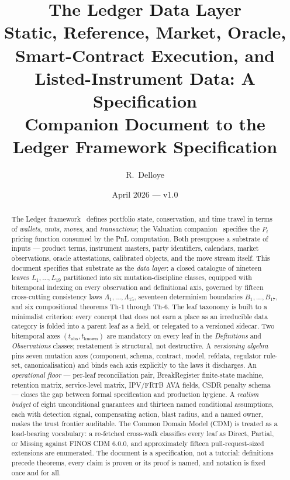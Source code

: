 \documentclass[11pt,a4paper]{article}
\title{The Ledger Data Layer\\[6pt]
\large Static, Reference, Market, Oracle, Smart-Contract Execution, and Listed-Instrument Data: A Specification\\[4pt]
\normalsize Companion Document to the Ledger Framework Specification}
\author{R.\ Delloye}
\date{April 2026 --- v1.0}
\begin{document}
\maketitle

\begin{abstract}
The Ledger framework~\cite{ledger} defines portfolio state, conservation, and time travel in terms of \emph{wallets}, \emph{units}, \emph{moves}, and \emph{transactions}; the Valuation companion~\cite{valuation} specifies the $P_t$ pricing function consumed by the PnL computation. Both presuppose a substrate of inputs --- product terms, instrument masters, party identifiers, calendars, market observations, oracle attestations, calibrated objects, and the move stream itself. This document specifies that substrate as the \emph{data layer}: a closed catalogue of nineteen leaves $L_1,\dots,L_{19}$ partitioned into six mutation-discipline classes, equipped with bitemporal indexing on every observation and definitional axis, governed by fifteen cross-cutting consistency laws $\Lambda_1,\dots,\Lambda_{15}$, seventeen determinism boundaries $B_1,\dots,B_{17}$, and six compositional theorems $\mathrm{Th}\textrm{-}1$ through $\mathrm{Th}\textrm{-}6$. The leaf taxonomy is built to a minimalist criterion: every concept that does not earn a place as an irreducible data category is folded into a parent leaf as a field, or relegated to a versioned sidecar. Two bitemporal axes $(t_{\mathrm{obs}}, t_{\mathrm{known}})$ are mandatory on every leaf in the \emph{Definitions} and \emph{Observations} classes; restatement is structural, not destructive. A \emph{versioning algebra} pins seven mutation axes (component, schema, contract, model, refdata, regulator rule-set, canonicalisation) and binds each axis explicitly to the laws it discharges. An \emph{operational floor} --- per-leaf reconciliation pair, BreakRegister finite-state machine, retention matrix, service-level matrix, IPV/FRTB AVA fields, CSDR penalty schema --- closes the gap between formal specification and production hygiene. A \emph{realism budget} of eight unconditional guarantees and thirteen named conditional assumptions, each with detection signal, compensating action, blast radius, and a named owner, makes the trust frontier auditable. The Common Domain Model (CDM) is treated as a load-bearing vocabulary: a re-fetched cross-walk classifies every leaf as Direct, Partial, or Missing against FINOS CDM 6.0.0, and approximately fifteen pull-request-sized extensions are enumerated. The document is a specification, not a tutorial: definitions precede theorems, every claim is proven or its proof is named, and notation is fixed once and for all.
\end{abstract}
\end{document}
